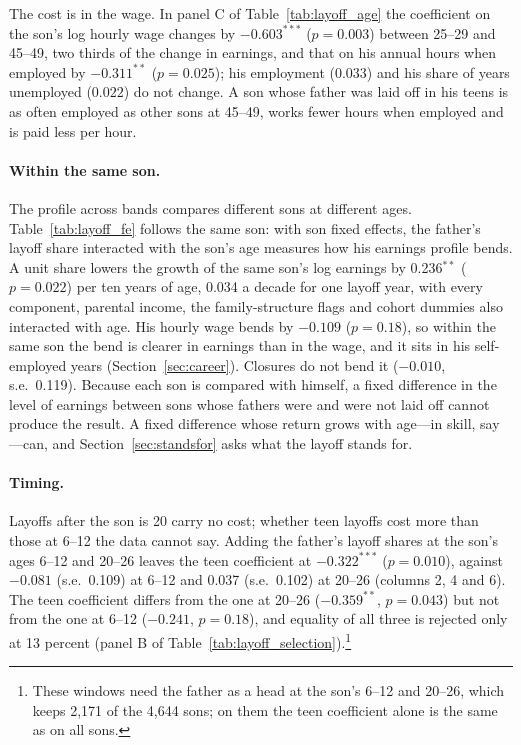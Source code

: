 

The cost is in the wage. In panel C of Table~\ref{tab:layoff_age} the coefficient on the son's log hourly wage changes by $-0.603^{***}$ ($p = 0.003$)
between 25--29 and 45--49, two thirds of the change in earnings, and that on his annual hours when employed by
$-0.311^{**}$ ($p = 0.025$); his employment ($0.033$) and his share of years unemployed ($0.022$) do not change. A son
whose father was laid off in his teens is as often employed as other sons at 45--49, works fewer hours when employed and
is paid less per hour.

\paragraph{Within the same son.} The profile across bands compares different sons at different ages. Table~\ref{tab:layoff_fe}
follows the same son: with son fixed effects, the father's layoff share interacted with the son's age measures how his
earnings profile bends. A unit share lowers the growth of the same son's log earnings by 0.236$^{**}$ ($p = 0.022$) per
ten years of age, 0.034 a decade for one layoff year, with every component, parental income, the family-structure flags
and cohort dummies also interacted with age. His hourly wage bends by $-0.109$ ($p = 0.18$), so within the same son
the bend is clearer in earnings than in the wage, and it sits in his self-employed years
(Section~\ref{sec:career}). Closures do not bend it ($-0.010$, s.e.\ 0.119). Because each son is
compared with himself, a fixed difference in the level of earnings between sons whose fathers were and were not laid
off cannot produce the result. A fixed difference whose return grows with age---in skill, say---can, and
Section~\ref{sec:standsfor} asks what the layoff stands for.

\paragraph{Timing.} Layoffs after the son is 20 carry no cost; whether teen layoffs cost more than those at 6--12 the data
cannot say. Adding the father's layoff shares at the son's ages 6--12 and 20--26 leaves the teen coefficient at
$-0.322^{***}$ ($p = 0.010$), against $-0.081$ (s.e.\ 0.109) at 6--12 and 0.037 (s.e.\ 0.102) at 20--26 (columns 2, 4
and 6). The teen coefficient differs from the one at 20--26 ($-0.359^{**}$, $p = 0.043$) but not from the one at 6--12
($-0.241$, $p = 0.18$), and equality of all three is rejected only at 13 percent (panel B of
Table~\ref{tab:layoff_selection}).\footnote{These windows need the father as a head at the son's 6--12 and 20--26,
which keeps 2,171 of the 4,644 sons; on them the teen coefficient alone is the same as on all sons.}


